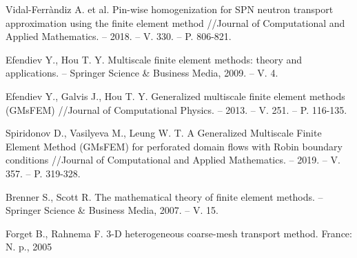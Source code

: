 \documentclass[10pt]{article}
\begin{document}
\begin{thebibliography}{8}
Vidal-Ferràndiz A. et al. Pin-wise homogenization for SPN neutron transport approximation using the finite element method //Journal of Computational and Applied Mathematics. – 2018. – V. 330. – P. 806-821.

Efendiev Y., Hou T. Y. Multiscale finite element methods: theory and applications. – Springer Science \& Business Media, 2009. – V. 4.

Efendiev Y., Galvis J., Hou T. Y. Generalized multiscale finite element methods (GMsFEM) //Journal of Computational Physics. – 2013. – V. 251. – P. 116-135.

Spiridonov D., Vasilyeva M., Leung W. T. A Generalized Multiscale Finite Element Method (GMsFEM) for perforated domain flows with Robin boundary conditions //Journal of Computational and Applied Mathematics. – 2019. – V. 357. – P. 319-328.

Brenner S., Scott R. The mathematical theory of finite element methods. – Springer Science \& Business Media, 2007. – V. 15.

Forget B., Rahnema F. 3-D heterogeneous coarse-mesh transport method. France: N. p., 2005

\end{thebibliography}
\end{document}
